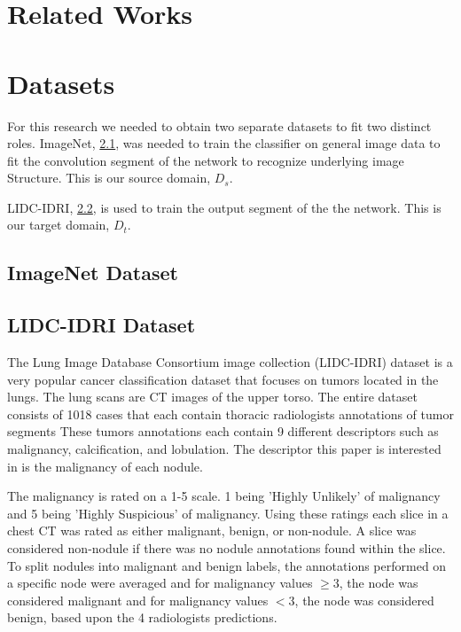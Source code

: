 \documentclass[10pt,twocolumn,letterpaper]{article}
\begin{document}
\section{Related Works} \label{works}

\section{Datasets} \label{data}
   For this research we needed to obtain two separate datasets to fit two
   distinct roles. ImageNet, \ref{data-imagenet}, was needed to train
   the classifier on general image data to fit the convolution segment of
   the network to recognize underlying image Structure. This is our source
   domain, $D_s$.

   LIDC-IDRI, \ref{data-lidc}, is used to train the output segment of the
   the network. This is our target domain, $D_t$.

   \subsection{ImageNet Dataset} \label{data-imagenet}


   \subsection{LIDC-IDRI Dataset} \label{data-lidc}
      The Lung Image Database Consortium image collection (LIDC-IDRI) dataset
      is a very popular cancer classification dataset that focuses on tumors located
      in the lungs. The lung scans are CT images of the upper torso. The entire dataset
      consists of 1018 cases that each contain thoracic radiologists annotations of tumor segments
      These tumors annotations each contain 9 different descriptors such as malignancy,
      calcification, and lobulation. The descriptor this paper is interested in is the
      malignancy of each nodule.

      The malignancy is rated on a 1-5 scale. 1 being 'Highly Unlikely' of malignancy and
      5 being 'Highly Suspicious' of malignancy. Using these ratings each slice in a chest CT
      was rated as either malignant, benign, or non-nodule. A slice was considered non-nodule
      if there was no nodule annotations found within the slice. To split nodules into malignant
      and benign labels, the annotations performed on a specific node were averaged and for malignancy
      values $\ge 3$, the node was considered malignant and for malignancy values $< 3$, the node was
      considered benign, based upon the 4 radiologists predictions.
\end{document}
